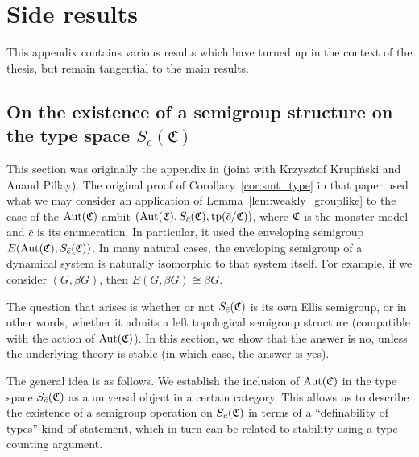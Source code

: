 	\chapter{Side results}
	\label{app:side}
	This appendix contains various results which have turned up in the context of the thesis, but remain tangential to the main results.
	
	\section[On the existence of a semigroup structure on the type space \texorpdfstring{${S_{\bar c}(\mathfrak{C})}$}{Sc(C)}]{On the existence of a semigroup structure on the type space \texorpdfstring{${S_{\bar c}(\mathfrak{C})}$}{Sc(C)}}
	\label{section: semigroup operation}
	This section was originally the appendix in \cite{KPR15} (joint with Krzysztof Krupiński and Anand Pillay). The original proof of Corollary~\ref{cor:smt_type} in that paper used what we may consider an application of Lemma~\ref{lem:weakly_grouplike} to the case of the $\operatorname{{Aut}}({\mathfrak C})$-ambit $(\operatorname{{Aut}}({\mathfrak C}),S_{\bar c}({\mathfrak C}),\operatorname{{tp}}(\bar c/{\mathfrak C}))$, where ${\mathfrak C}$ is the monster model and $\bar c$ is its enumeration. In particular, it used the enveloping semigroup $E(\operatorname{{Aut}}({\mathfrak C}),S_{\bar c}({\mathfrak C}))$. In many natural cases, the enveloping semigroup of a dynamical system is naturally isomorphic to that system itself. For example, if we consider $(G,\beta G)$, then $E(G,\beta G)\cong \beta G$.
	
	The question that arises is whether or not $S_{\bar c}({\mathfrak C})$ is its own Ellis semigroup, or in other words, whether it admits a left topological semigroup structure (compatible with the action of $\operatorname{{Aut}}({\mathfrak C})$). In this section, we show that the answer is no, unless the underlying theory is stable (in which case, the answer is yes).
	
	The general idea is as follows. We establish the inclusion of $\operatorname{{Aut}}({\mathfrak C})$ in the type space $S_{\bar c}({\mathfrak C})$ as a universal object in a certain category. This allows us to describe the existence of a semigroup operation on $S_{\bar c}({\mathfrak C})$ in terms of a ``definability of types'' kind of statement, which in turn can be related to stability using a type counting argument.
	
